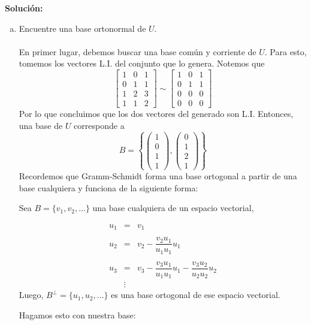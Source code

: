\documentclass[12pt]{article}
\newenvironment{solucion}
{\begin{mdframed}[backgroundcolor=black!10]
		{\bf Solución:}\\
	}
	{
	\end{mdframed}
}
\newenvironment{preguntas}
{\begin{enumerate}\itemsep12pt
	}
	{
	\end{enumerate}
}
\begin{document}
\begin{preguntas}
\begin{solucion}
\begin{enumerate}[a)]
\item Encuentre una base ortonormal de $U$.\\
			\\
			En primer lugar, debemos buscar una base común y corriente de $U$. Para esto, tomemos los vectores L.I. del conjunto que lo genera. Notemos que
			$$\begin{bmatrix}
			1 & 0 & 1 \\
			0 & 1 & 1 \\
			1 & 2 & 3 \\
			1 & 1 & 2
			\end{bmatrix} \sim
			\begin{bmatrix}
			1 & 0 & 1 \\
			0 & 1 & 1 \\
			0 & 0 & 0 \\
			0 & 0 & 0
			\end{bmatrix}$$
			Por lo que concluimos que los dos vectores del generado son L.I. Entonces, una base de $U$ corresponde a
			$$B = \left\{ \begin{pmatrix}
			1 \\ 0 \\ 1 \\ 1
			\end{pmatrix},\begin{pmatrix}
			0 \\ 1 \\ 2 \\ 1
			\end{pmatrix} \right\}$$
			Recordemos que Gramm-Schmidt forma una base ortogonal a partir de una base cualquiera y funciona de la siguiente forma:
			
			Sea $B = \{v_1, v_2, \dots \}$ una base cualquiera de un espacio vectorial,
			
			$$\begin{array}{rcl}
			u_1 & = & v_1 \\\\
			u_2 & = & v_2 - \dfrac{v_2u_1}{u_1u_1}u_1 \\\\
			u_3 & = & v_3 - \dfrac{v_3u_1}{u_1u_1}u_1 - \dfrac{v_3u_2}{u_2u_2}u_2\\
			& \vdots & 			
			\end{array}$$
			Luego, $B^{\perp} = \{u_1, u_2, \dots \}$ es una base ortogonal de ese espacio vectorial.
			
			Hagamos esto con nuestra base:
			

\end{enumerate}
\end{solucion}
\end{preguntas}
\end{document}
